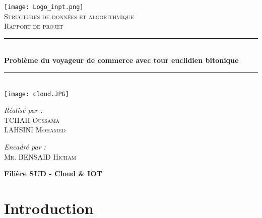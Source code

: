 \documentclass[12pt, openany]{report}
\newcommand{\HRule}{\rule{\linewidth}{0.5mm}}
\begin{document}
\begin{titlepage}
  \begin{sffamily}
  \begin{center}

    \texttt{[image: Logo\_inpt.png]}~\\[1cm]

    \textsc{\LARGE Structures de données et algorithmique}\\[1cm]

    \textsc{\huge Rapport de projet}\\[1cm]

    \HRule \\[0.4cm]
    { \huge \bfseries Problème du voyageur de commerce avec tour euclidien bitonique\\[0.4cm] }

    \HRule \\[1cm]
    \texttt{[image: cloud.JPG]}
    \\[2cm]

    \begin{minipage}{0.4\textwidth}
      \begin{flushleft} \large
        \emph{Réalisé par : } \textsc{\\TCHAH Oussama \\ LAHSINI Mohamed}
      \end{flushleft}
    \end{minipage}
    \begin{minipage}{0.4\textwidth}
      \begin{flushright} \large
        \emph{Encadré par :} \textsc{\\Mr. BENSAID Hicham}\\

      \end{flushright}
    \end{minipage}

    \vfill

    {\large \textbf{Filière SUD - Cloud \& IOT}}

  \end{center}
  \end{sffamily}
\end{titlepage}
\newpage
\tableofcontents
\newpage
\section{Introduction}
\end{document}
